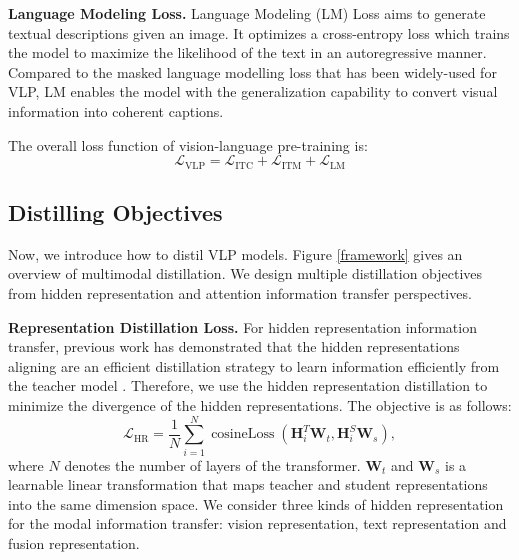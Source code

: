 \documentclass[10pt,twocolumn,letterpaper]{article}
\begin{document}
\vspace{0.4em}
\par
\noindent
\textbf{Language Modeling Loss.}
Language Modeling (LM) Loss aims to generate textual descriptions given an image. It optimizes a cross-entropy loss which trains the model to maximize the likelihood of the text in an autoregressive manner. 
Compared to the masked language modelling loss that has been widely-used for VLP, LM enables the model with the generalization capability to convert visual information into coherent captions.

The overall loss function of vision-language pre-training is:
\begin{equation}\label{vlp_loss}
\mathcal{L}_{\mathrm{VLP}}=\mathcal{L}_{\mathrm{ITC}}+\mathcal{L}_{\mathrm{ITM}}+\mathcal{L}_{\mathrm{LM}}
\end{equation}


\subsection{Distilling Objectives}
Now, we introduce how to distil VLP models. Figure \ref{framework} gives an overview of multimodal distillation.
We design multiple distillation objectives from hidden representation and attention information transfer perspectives.

\vspace{0.4em}
\par
\noindent
\textbf{Representation Distillation Loss.}
For hidden representation information transfer, previous work has demonstrated that the hidden representations aligning are an efficient distillation strategy to learn information efficiently from the teacher model \cite{jiao2019tinybert, fang2021compressing, wang2022efficientvlm}.
Therefore, we use the hidden representation distillation to minimize the divergence of the hidden representations. 
The objective is as follows: 
\begin{equation}\label{hr_loss}
    \mathcal{L}_{\mathrm{HR}}=\frac{1}{N} \sum_{i=1}^N \operatorname{cosineLoss} \left(\mathbf{H}_{i}^T \mathbf{W}_t, \mathbf{H}_{i}^S \mathbf{W}_s \right),
\end{equation}
where $N$ denotes the number of layers of the transformer. $\mathbf{W}_t$ and $\mathbf{W}_s$ is a learnable linear transformation that maps teacher and student representations into the same dimension space. We consider three kinds of hidden representation for the modal information transfer: vision representation, text representation and fusion representation. 
\end{document}
